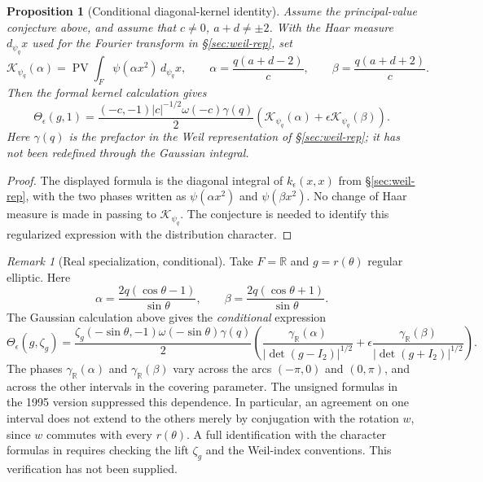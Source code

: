 \documentclass[12pt,letterpaper,openany]{book}
\theoremstyle{plain}
\newtheorem{proposition}[theorem]{Proposition}
\theoremstyle{definition}
\theoremstyle{remark}
\theoremstyle{remark}
\newtheorem{remyy}{Remark}
\begin{document}
\begin{proposition}[Conditional diagonal-kernel identity]
\label{prop:kernel-conditional}
Assume the principal-value conjecture above, and assume that
$c\ne0$, $a+d\ne\pm2$. With the Haar measure $d_{\psi_q}x$
used for the Fourier transform in \S\ref{sec:weil-rep}, set
\[
\mathcal K_{\psi_q}(\alpha)
=\operatorname{PV}\int_F\psi(\alpha x^2)\,d_{\psi_q}x,\qquad
\alpha=\frac{q(a+d-2)}{c},\qquad
\beta=\frac{q(a+d+2)}{c}.
\]
Then the formal kernel calculation gives
\[
\Theta_\epsilon(g,1)=
\frac{(-c,-1)|c|^{-1/2}\omega(-c)\gamma(q)}{2}
\left(\mathcal K_{\psi_q}(\alpha)
+\epsilon\mathcal K_{\psi_q}(\beta)\right).
\]
Here $\gamma(q)$ is the prefactor in the Weil representation
of \S\ref{sec:weil-rep}; it has not been redefined through the
Gaussian integral.
\end{proposition}

\begin{proof}
The displayed formula is the diagonal integral of
$k_\epsilon(x,x)$ from \S\ref{sec:weil-rep}, with the two
phases written as $\psi(\alpha x^2)$ and $\psi(\beta x^2)$.
No change of Haar measure is made in passing to
$\mathcal K_{\psi_q}$. The conjecture is needed to identify
this regularized expression with the distribution character.
\end{proof}

\begin{remyy}[Real specialization, conditional]
\label{rem26:real-kernel}
Take $F=\mathbb R$ and $g=r(\theta)$ regular elliptic.
Here
\[
\alpha=\frac{2q(\cos\theta-1)}{\sin\theta},\qquad
\beta =\frac{2q(\cos\theta+1)}{\sin\theta}.
\]
The Gaussian calculation above gives the \emph{conditional} expression
\[
\Theta_\epsilon(g,\zeta_g)=
\frac{\zeta_g(-\sin\theta,-1)\omega(-\sin\theta)\gamma(q)}{2}
\left(
\frac{\gamma_{\mathbb R}(\alpha)}
     {|\det(g-I_2)|^{1/2}}
+\epsilon
\frac{\gamma_{\mathbb R}(\beta)}
     {|\det(g+I_2)|^{1/2}}
\right).
\]
The phases $\gamma_{\mathbb R}(\alpha)$ and
$\gamma_{\mathbb R}(\beta)$ vary across the arcs
$(-\pi,0)$ and $(0,\pi)$, and across the other intervals in
the covering parameter. The unsigned formulas in the 1995
version suppressed this dependence. In particular, an
agreement on one interval does not extend to the others
merely by conjugation with the rotation $w$, since $w$
commutes with every $r(\theta)$.
A full identification with the character formulas in
\cite{Ad1} requires checking the lift $\zeta_g$ and the
Weil-index conventions. This verification has not been supplied.
\end{remyy}
\end{document}
